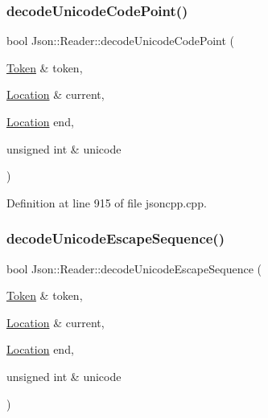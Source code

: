 \hypertarget{class_json_1_1_reader_a8fe24db3e9953aef3d637a56447e795c}{}\label{class_json_1_1_reader_a8fe24db3e9953aef3d637a56447e795c} 
\subsubsection{\texorpdfstring{decode\+Unicode\+Code\+Point()}{decodeUnicodeCodePoint()}\hspace{0.1cm}{\footnotesize\ttfamily [2/2]}}
{\footnotesize\ttfamily bool Json\+::\+Reader\+::decode\+Unicode\+Code\+Point (\begin{DoxyParamCaption}\item[{\hyperlink{class_json_1_1_reader_1_1_token}{Token} \&}]{token,  }\item[{\hyperlink{class_json_1_1_reader_a46795b5b272bf79a7730e406cb96375a}{Location} \&}]{current,  }\item[{\hyperlink{class_json_1_1_reader_a46795b5b272bf79a7730e406cb96375a}{Location}}]{end,  }\item[{unsigned int \&}]{unicode }\end{DoxyParamCaption})\hspace{0.3cm}{\ttfamily [private]}}



Definition at line 915 of file jsoncpp.\+cpp.

\hypertarget{class_json_1_1_reader_a469cb6f55971d7c41fca2752a3aa5bf7}{}\label{class_json_1_1_reader_a469cb6f55971d7c41fca2752a3aa5bf7} 
\subsubsection{\texorpdfstring{decode\+Unicode\+Escape\+Sequence()}{decodeUnicodeEscapeSequence()}\hspace{0.1cm}{\footnotesize\ttfamily [1/2]}}
{\footnotesize\ttfamily bool Json\+::\+Reader\+::decode\+Unicode\+Escape\+Sequence (\begin{DoxyParamCaption}\item[{\hyperlink{class_json_1_1_reader_1_1_token}{Token} \&}]{token,  }\item[{\hyperlink{class_json_1_1_reader_a46795b5b272bf79a7730e406cb96375a}{Location} \&}]{current,  }\item[{\hyperlink{class_json_1_1_reader_a46795b5b272bf79a7730e406cb96375a}{Location}}]{end,  }\item[{unsigned int \&}]{unicode }\end{DoxyParamCaption})\hspace{0.3cm}{\ttfamily [private]}}

